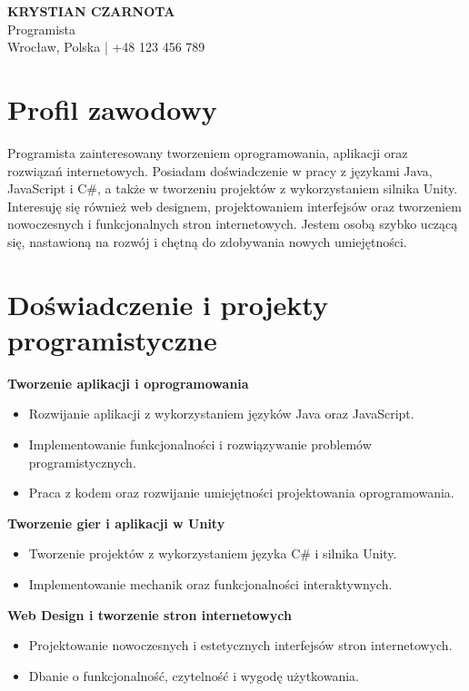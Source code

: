 \documentclass[10pt,a4paper]{article}
\begin{document}
\begin{center}
    {\Huge \textbf{\color{maincolor} KRYSTIAN CZARNOTA}}\\[5pt]
    {\large Programista}\\[7pt]

    Wrocław, Polska \quad | \quad
    +48 123 456 789
\end{center}

\section*{Profil zawodowy}

Programista zainteresowany tworzeniem oprogramowania,
aplikacji oraz rozwiązań internetowych. Posiadam doświadczenie
w pracy z językami Java, JavaScript i C\#, a także w tworzeniu
projektów z wykorzystaniem silnika Unity. Interesuję się
również web designem, projektowaniem interfejsów oraz
tworzeniem nowoczesnych i funkcjonalnych stron internetowych.
Jestem osobą szybko uczącą się, nastawioną na rozwój
i chętną do zdobywania nowych umiejętności.

\section*{Doświadczenie i projekty programistyczne}

\textbf{Tworzenie aplikacji i oprogramowania}
\begin{itemize}
    \item Rozwijanie aplikacji z wykorzystaniem języków Java
    oraz JavaScript.
    \item Implementowanie funkcjonalności i rozwiązywanie
    problemów programistycznych.
    \item Praca z kodem oraz rozwijanie umiejętności
    projektowania oprogramowania.
\end{itemize}

\textbf{Tworzenie gier i aplikacji w Unity}
\begin{itemize}
    \item Tworzenie projektów z wykorzystaniem języka C\#
    i silnika Unity.
    \item Implementowanie mechanik oraz funkcjonalności
    interaktywnych.
\end{itemize}

\textbf{Web Design i tworzenie stron internetowych}
\begin{itemize}
    \item Projektowanie nowoczesnych i estetycznych
    interfejsów stron internetowych.
    \item Dbanie o funkcjonalność, czytelność
    i wygodę użytkowania.
\end{itemize}
\end{document}
